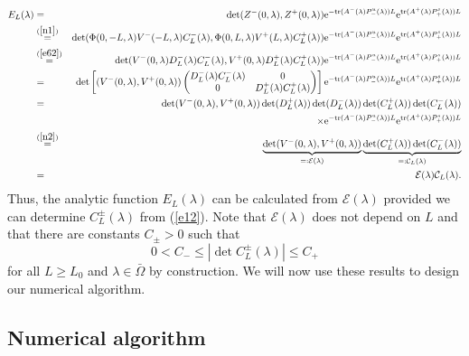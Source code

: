 \documentclass[10pt]{article}
\numberwithin{equation}{section}
\newcommand{\rme}{\mathrm{e}}
\begin{document}
\begin{eqnarray*}
E_L(\lambda) & = & \det(Z^-(0,\lambda),Z^+(0,\lambda))
\rme^{-\mathrm{tr}(A^-(\lambda)P^u_-(\lambda))L} \rme^{\mathrm{tr}(A^+(\lambda)P^s_+(\lambda))L} \\ & \stackrel{(\ref{n1})}{=} &
\det(\Phi(0,-L,\lambda)V^-(-L,\lambda)C^-_L(\lambda),\Phi(0,L,\lambda)V^+(L,\lambda)C^+_L(\lambda))
\rme^{-\mathrm{tr}(A^-(\lambda)P^u_-(\lambda))L} \rme^{\mathrm{tr}(A^+(\lambda)P^s_+(\lambda))L} \\ & \stackrel{(\ref{e62})}{=}  &
\det(V^-(0,\lambda)D^-_L(\lambda)C^-_L(\lambda),V^+(0,\lambda)D^+_L(\lambda)C^+_L(\lambda))
\rme^{-\mathrm{tr}(A^-(\lambda)P^u_-(\lambda))L} \rme^{\mathrm{tr}(A^+(\lambda)P^s_+(\lambda))L} \\ & = &
\det\left[ (V^-(0,\lambda),V^+(0,\lambda)) 
\begin{pmatrix} D^-_L(\lambda)C^-_L(\lambda) & 0 \\ 0 & D^+_L(\lambda)C^+_L(\lambda) \end{pmatrix}\right]
\rme^{-\mathrm{tr}(A^-(\lambda)P^u_-(\lambda))L} \rme^{\mathrm{tr}(A^+(\lambda)P^s_+(\lambda))L} \\ & = &
\det(V^-(0,\lambda),V^+(0,\lambda))
\det(D^+_L(\lambda)) \det(D^-_L(\lambda))
\det(C^+_L(\lambda)) \det(C^-_L(\lambda)) \\ && \times
\rme^{-\mathrm{tr}(A^-(\lambda)P^u_-(\lambda))L} \rme^{\mathrm{tr}(A^+(\lambda)P^s_+(\lambda))L} \\ & \stackrel{(\ref{n2})}{=} &
\underbrace{\det(V^-(0,\lambda),V^+(0,\lambda))}_{=:\mathcal{E}(\lambda)} \underbrace{\det(C^+_L(\lambda)) \det(C^-_L(\lambda))}_{=:\mathcal{C}_L(\lambda)} \\ & = &
\mathcal{E}(\lambda) \mathcal{C}_L(\lambda).
\end{eqnarray*}
Thus, the analytic function $E_L(\lambda)$ can be calculated from $\mathcal{E}(\lambda)$ provided we can determine $C^\pm_L(\lambda)$ from (\ref{e12}). Note that $\mathcal{E}(\lambda)$ does not depend on $L$ and that there are constants $C_\pm>0$ such that
\begin{equation}\label{e71}
0 < C_- \leq |\det C^\pm_L(\lambda)| \leq C_+
\end{equation}
for all $L\geq L_0$ and $\lambda\in\bar\Omega$ by construction. We will now use these results to design our numerical algorithm.


\subsection{Numerical algorithm}\label{s2.4}
\end{document}
